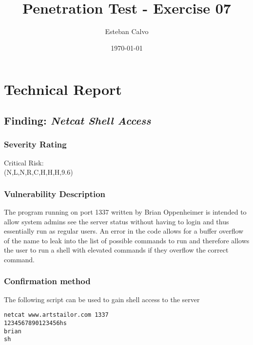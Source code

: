 \documentclass[notitlepage]{article}
\begin{document}
  
\title{Penetration Test - Exercise 07}
\author{Esteban Calvo}
\date{\isodate\today}

\maketitle

\tableofcontents

\newpage

\section{Technical Report}


  \subsection{Finding: \emph{Netcat Shell Access}}
  
	\subsubsection*{Severity Rating}
		Critical Risk: \\
		\cvss(N,L,N,R,C,H,H,H,9.6)
		
  	\subsubsection*{Vulnerability Description}
  		The program running on port 1337 written by Brian Oppenheimer is intended to allow system admins see the server status without having to login and
        thus essentially run as regular users. An error in the code allows for a buffer overflow of the name to leak into the list of possible commands to run
        and therefore allows the user to run a shell with elevated commands if they overflow the correct command. 
  	\subsubsection*{Confirmation method}
  	    The following script can be used to gain shell access to the server
    \begin{verbatim}
netcat www.artstailor.com 1337
1234567890123456hs
brian
sh
    \end{verbatim}
				
\end{document}

